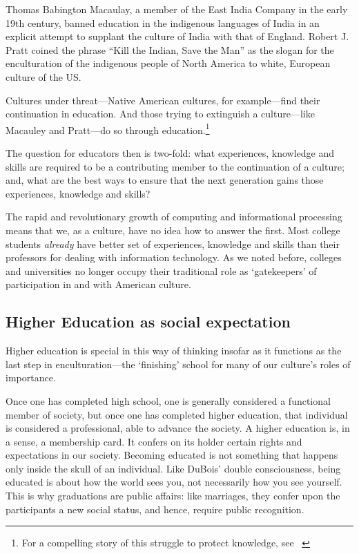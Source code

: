 Thomas Babington Macaulay, a member of the East India Company in the early 19th century, banned education in the indigenous languages of India in an explicit attempt to supplant the culture of India with that of England. Robert J. Pratt coined the phrase ``Kill the Indian, Save the Man'' as the slogan for the enculturation of the indigenous people of North America to white, European culture of the US. 

Cultures under threat---Native American cultures, for example---find their continuation in education. And those trying to extinguish a culture---like Macauley and Pratt---do so through education.\footnote{For a compelling story of this struggle to protect knowledge, see ~\citep{Hammer:2016vl}}

The question for educators then is two-fold: what experiences, knowledge and skills are required to be a contributing member to the continuation of a culture; and, what are the best ways to ensure that the next generation gains those experiences, knowledge and skills? 

The rapid and revolutionary growth of computing and informational processing means that we, as a culture, have no idea how to answer the first. Most college students \emph{already} have better set of experiences, knowledge and skills than their professors for dealing with information technology. As we noted before, colleges and universities no longer occupy their traditional role as `gatekeepers' of participation in and with American culture.

\subsection{Higher Education as social expectation}
\label{highereducationassocialexpectation}

Higher education is special in this way of thinking insofar as it functions as the last step in enculturation---the `finishing' school for many of our culture's roles of importance. 

Once one has completed high school, one is generally considered a functional member of society, but once one has completed higher education, that individual is considered a professional, able to advance the society. A higher education is, in a sense, a membership card. It confers on its holder certain rights and expectations in our society. Becoming educated is not something that happens only inside the skull of an individual. Like DuBois' double consciousness, being educated is about how the world sees you, not necessarily how you see yourself. This is why graduations are public affairs: like marriages, they confer upon the participants a new social status, and hence, require public recognition.


